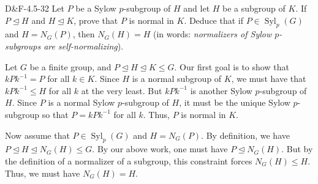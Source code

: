 \documentclass{article}
\begin{document}
	\begin{prb}{D\&F-4.5-32}
		Let $P$ be a Sylow $p$-subgroup of $H$ and let $H$ be a subgroup of $K$. If $P \trianglelefteq H$ and $H \trianglelefteq K$, prove that $P$ is normal in $K$. Deduce that if $P \in \operatorname{Syl}_{p}(G)$ and $H = N_{G}(P)$, then $N_{G}(H) = H$ (in words: \textit{normalizers of Sylow $p$-subgroups are self-normalizing}). 
	\end{prb}
	Let $G$ be a finite group, and $P \trianglelefteq H \trianglelefteq K \leq G$. Our first goal is to show that $kPk^{-1} = P$ for all $k \in K$. Since $H$ is a normal subgroup of $K$, we must have that $kPk^{-1} \leq H$ for all $k$ at the very least. But $kPk^{-1}$ is another Sylow $p$-subgroup of $H$. Since $P$ is a normal Sylow $p$-subgroup of $H$, it must be the unique Sylow $p$-subgroup so that $P = kPk^{-1}$ for all $k$. Thus, $P$ is normal in $K$. 
	
	Now assume that $P \in \operatorname{Syl}_{p}(G)$ and $H = N_{G}(P)$. By definition, we have $P \trianglelefteq H \trianglelefteq N_{G}(H) \leq G$. By our above work, one must have $P \trianglelefteq N_{G}(H)$. But by the definition of a normalizer of a subgroup, this constraint forces $N_{G}(H) \leq H$. Thus, we must have $N_{G}(H) = H$. 
	
\end{document}
